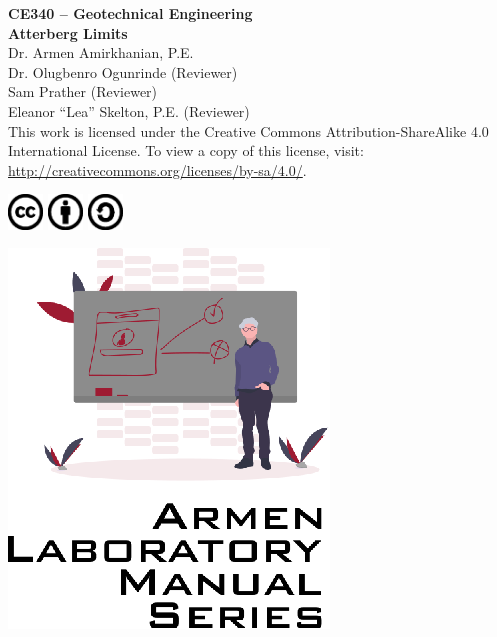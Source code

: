 \documentclass[12pt]{article}
\newcommand{\CourseNum}{CE340}
\newcommand{\CourseName}{Geotechnical Engineering}
\newcommand{\LabTitle}{Atterberg Limits}
\begin{document}
\begin{titlepage}
\begin{flushright}
\LARGE{\textbf{\CourseNum{} -- \CourseName}}\\
\vfill
\Huge{\textbf{\LabTitle}}\\
    \vfill
    \large Dr. Armen Amirkhanian, P.E.\\
    \normalsize Dr. Olugbenro Ogunrinde (Reviewer)\\
    \normalsize Sam Prather (Reviewer)\\
    \normalsize Eleanor ``Lea'' Skelton, P.E. (Reviewer)\\
\vfill
\normalsize This work is licensed under the Creative Commons Attribution-ShareAlike 4.0 International License. To view a copy of this license, visit:
\href{http://creativecommons.org/licenses/by-sa/4.0/}{http://creativecommons.org/licenses/by-sa/4.0/}.

\includegraphics[width=0.07\textwidth]{cc.eps}
\includegraphics[width=0.07\textwidth]{by.eps}
\includegraphics[width=0.07\textwidth]{sa.eps}
\vfill

\includegraphics[width=0.3\linewidth]{Logo.eps}\\ 
 
  
\end{flushright}
\end{titlepage}
\end{document}
